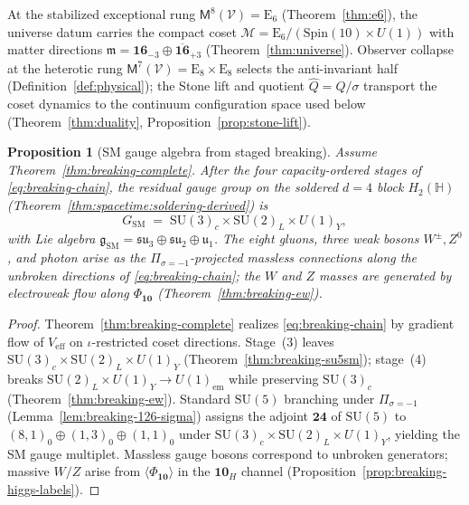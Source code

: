 \documentclass[aps,prd,onecolumn,amsmath,amssymb,nofootinbib,11pt]{revtex4-2}
\numberwithin{equation}{section}
\theoremstyle{plain}
\newtheorem{proposition}[theorem]{Proposition}
\theoremstyle{definition}
\theoremstyle{remark}
\newcommand{\Quat}{\mathbb{H}}
\newcommand{\E}[1]{\mathrm{E}_{#1}}
\newcommand{\Spin}{\mathrm{Spin}}
\newcommand{\Void}{\mathcal{V}}
\newcommand{\Mirror}{\mathsf{M}}
\begin{document}
At the stabilized exceptional rung $\Mirror^8(\Void)=\E{6}$
(Theorem~\ref{thm:e6}), the universe datum carries the compact coset
$\mathcal{M}=\E{6}/(\Spin(10)\times U(1))$ with matter directions
$\mathfrak{m}=\mathbf{16}_{-3}\oplus\overline{\mathbf{16}}_{+3}$
(Theorem~\ref{thm:universe}). Observer collapse at the heterotic rung
$\Mirror^7(\Void)=\E{8}\times\E{8}$ selects the anti-invariant half
(Definition~\ref{def:physical}); the Stone lift and quotient
$\hat Q=Q/\sigma$ transport the coset dynamics to the continuum
configuration space used below (Theorem~\ref{thm:duality},
Proposition~\ref{prop:stone-lift}).

\begin{proposition}[SM gauge algebra from staged breaking]
\label{prop:sm-gauge-content}
Assume Theorem~\ref{thm:breaking-complete}. After the four capacity-ordered
stages of \eqref{eq:breaking-chain}, the residual gauge group on the
soldered $d=4$ block $H_2(\Quat)$ (Theorem~\ref{thm:spacetime:soldering-derived})
is
\begin{equation}\label{eq:sm-gauge-group}
  G_{\mathrm{SM}}
  \;=\;
  \mathrm{SU}(3)_c\times\mathrm{SU}(2)_L\times U(1)_Y,
\end{equation}
with Lie algebra $\mathfrak{g}_{\mathrm{SM}}=\mathfrak{su}_3\oplus\mathfrak{su}_2
\oplus\mathfrak{u}_1$. The eight gluons, three weak bosons
$W^\pm,Z^0$, and photon arise as the $\Pi_{\sigma=-1}$-projected massless
connections along the unbroken directions of \eqref{eq:breaking-chain}; the
$W$ and $Z$ masses are generated by electroweak flow along $\Phi_{\mathbf{10}}$
(Theorem~\ref{thm:breaking-ew}).
\end{proposition}

\begin{proof}
Theorem~\ref{thm:breaking-complete} realizes
\eqref{eq:breaking-chain} by gradient flow of $V_{\mathrm{eff}}$ on
$\iota$-restricted coset directions. Stage~(3) leaves
$\mathrm{SU}(3)_c\times\mathrm{SU}(2)_L\times U(1)_Y$
(Theorem~\ref{thm:breaking-su5sm}); stage~(4) breaks
$\mathrm{SU}(2)_L\times U(1)_Y\to U(1)_{\mathrm{em}}$ while preserving
$\mathrm{SU}(3)_c$ (Theorem~\ref{thm:breaking-ew}). Standard $\mathrm{SU}(5)$
branching under $\Pi_{\sigma=-1}$ (Lemma~\ref{lem:breaking-126-sigma})
assigns the adjoint $\mathbf{24}$ of $\mathrm{SU}(5)$ to
$(8,1)_0\oplus(1,3)_0\oplus(1,1)_0$ under
$\mathrm{SU}(3)_c\times\mathrm{SU}(2)_L\times U(1)_Y$, yielding the SM gauge
multiplet. Massless gauge bosons correspond to unbroken generators; massive
$W/Z$ arise from $\langle\Phi_{\mathbf{10}}\rangle$ in the $\mathbf{10}_H$
channel (Proposition~\ref{prop:breaking-higgs-labels}).
\end{proof}
\end{document}
